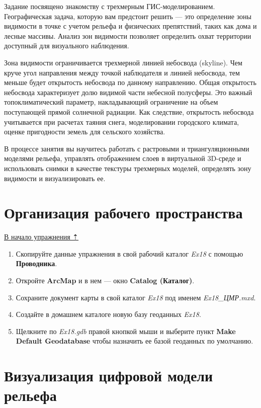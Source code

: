\documentclass[12pt,]{book}
\begin{document}
Задание посвящено знакомству с трехмерным ГИС-моделированием. Географическая задача, которую вам предстоит решить --- это определение зоны видимости в точке с учетом рельефа и физических препятствий, таких как дома и лесные массивы. Анализ зон видимости позволяет определить охват территории доступный для визуального наблюдения.

Зона видимости ограничивается трехмерной линией небосвода (skyline). Чем круче угол направления между точкой наблюдателя и линией небосвода, тем меньше будет открытость небосвода по данному направлению. Общая открытость небосвода характеризует долю видимой части небесной полусферы. Это важный топоклиматический параметр, накладывающий ограничение на объем поступающей прямой солнечной радиации. Как следствие, открытость небосвода учитывается при расчетах таяния снега, моделировании городского климата, оценке пригодности земель для сельского хозяйства.

В процессе занятия вы научитесь работать с растровыми и триангуляционными моделями рельефа, управлять отображением слоев в виртуальной 3D-среде и использовать снимки в качестве текстуры трехмерных моделей, определять зону видимости и визуализировать ее.

\hypertarget{threed-modelling-workspace}{%
\section{Организация рабочего пространства}\label{threed-modelling-workspace}}

\protect\hyperlink{threed-modelling}{В начало упражнения ⇡}

\begin{enumerate}
\def\labelenumi{\arabic{enumi}.}
\item
  Скопируйте данные упражнения в свой рабочий каталог \emph{Ex18} с помощью \textbf{Проводника}.
\item
  Откройте \textbf{ArcMap} и в нем --- окно \textbf{Catalog (Каталог)}.
\item
  Сохраните документ карты в свой каталог \emph{Ex18} под именем \emph{Ex18\_ЦМР.mxd}.
\item
  Создайте в домашнем каталоге новую базу геоданных \emph{Ex18}.
\item
  Щелкните по \emph{Ex18.gdb} правой кнопкой мыши и выберите пункт \textbf{Make Default Geodatabase} чтобы назначить ее базой геоданных по умолчанию.
\end{enumerate}

\hypertarget{threed-modelling-demviz}{%
\section{Визуализация цифровой модели рельефа}\label{threed-modelling-demviz}}
\end{document}
